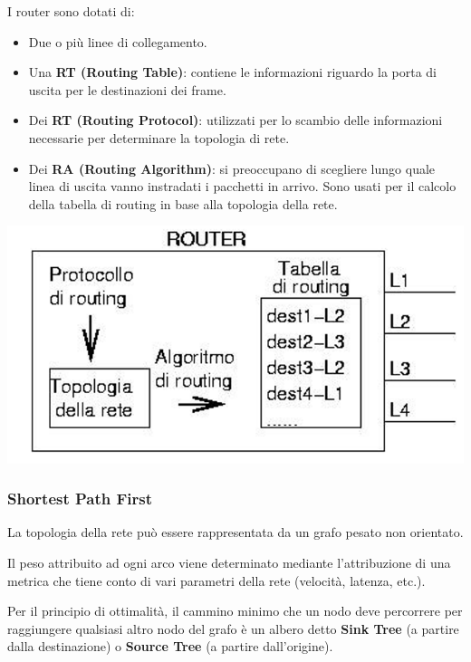         I router sono dotati di:
        \begin{itemize}
            \item Due o più linee di collegamento.
            \item Una \textbf{RT (Routing Table)}: contiene le informazioni riguardo la porta di uscita per le destinazioni dei frame.
            \item Dei \textbf{RT (Routing Protocol)}: utilizzati per lo scambio delle informazioni necessarie per determinare la topologia di rete.
            \item Dei \textbf{RA (Routing Algorithm)}: si preoccupano di scegliere lungo quale linea di uscita vanno instradati i pacchetti in arrivo. Sono usati per il calcolo della tabella di routing in base alla topologia della rete.
        \end{itemize}

        \begin{center}
            \includegraphics[scale=0.4]{chapters/4/assets/schema_n.png}
        \end{center}

        \subsubsection{Shortest Path First}
            La topologia della rete può essere rappresentata da un grafo pesato non orientato.
        
            Il peso attribuito ad ogni arco viene determinato mediante l'attribuzione di una metrica che tiene conto di vari parametri della rete (velocità, latenza, etc.).
        
            Per il principio di ottimalità, il cammino minimo che un nodo deve percorrere per raggiungere qualsiasi altro nodo del grafo è un albero detto \textbf{Sink Tree} (a partire dalla destinazione) o \textbf{Source Tree} (a partire dall'origine).
        

